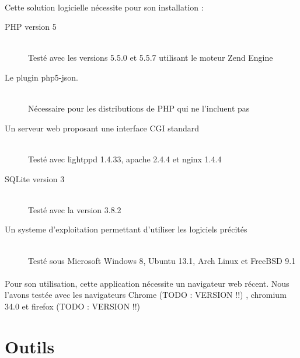     \paragraph{}
        Cette solution logicielle nécessite pour son installation :
        \begin{description}
            \item[PHP version 5]\hfill \\
                Testé avec les versions 5.5.0 et 5.5.7 utilisant le moteur Zend Engine
            \item[Le plugin php5-json.]\hfill \\
                Nécessaire pour les distributions de PHP qui ne l'incluent pas
            \item[Un serveur web proposant une interface CGI standard]\hfill \\
                Testé avec lightppd 1.4.33, apache 2.4.4 et nginx 1.4.4
            \item[SQLite version 3]\hfill \\
                Testé avec la version 3.8.2
            \item[Un systeme d'exploitation permettant d'utiliser les logiciels précités]\hfill \\
                Testé sous Microsoft Windows 8, Ubuntu 13.1, Arch Linux et FreeBSD 9.1
        \end{description}

    \paragraph{}
        Pour son utilisation, cette application nécessite un navigateur web
        récent. Nous l'avons testée avec les navigateurs Chrome
        (TODO : VERSION !!)
        , chromium 34.0 et firefox
        (TODO : VERSION !!)

\pagebreak
\section{Outils}
